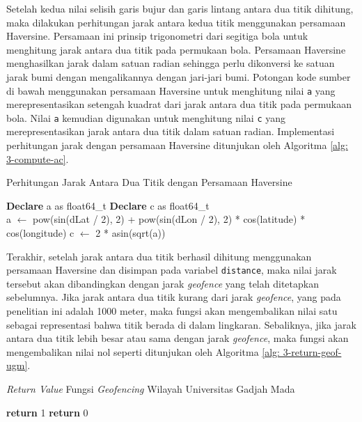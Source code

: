 Setelah kedua nilai selisih garis bujur dan garis lintang antara dua titik dihitung, maka dilakukan perhitungan jarak antara kedua titik menggunakan persamaan Haversine. Persamaan ini prinsip trigonometri dari segitiga bola untuk menghitung jarak antara dua titik pada permukaan bola. Persamaan Haversine menghasilkan jarak dalam satuan radian sehingga perlu dikonversi ke satuan jarak bumi dengan mengalikannya dengan jari-jari bumi. Potongan kode sumber di bawah menggunakan persamaan Haversine untuk menghitung nilai \texttt{a} yang merepresentasikan setengah kuadrat dari jarak antara dua titik pada permukaan bola. Nilai \texttt{a} kemudian digunakan untuk menghitung nilai \texttt{c} yang merepresentasikan jarak antara dua titik dalam satuan radian. Implementasi perhitungan jarak dengan persamaan Haversine ditunjukan oleh Algoritma \ref{alg: 3-compute-ac}.

\begin{algorithm}[H]
	\caption{Perhitungan Jarak Antara Dua Titik dengan Persamaan Haversine}
	\label{alg: 3-compute-ac}
	\begin{algorithmic}[1]
	\State \textbf{Declare} a as float64\_t
	\State \textbf{Declare} c as float64\_t
	\\
	\State a $\gets$ pow(sin(dLat / 2), 2) + pow(sin(dLon / 2), 2) * cos(latitude) * cos(longitude)
	\State c $\gets$ 2 * asin(sqrt(a))			
	\end{algorithmic}
\end{algorithm}

Terakhir, setelah jarak antara dua titik berhasil dihitung menggunakan persamaan Haversine dan disimpan pada variabel \texttt{distance}, maka nilai jarak tersebut akan dibandingkan dengan jarak \textit{geofence} yang telah ditetapkan sebelumnya. Jika jarak antara dua titik kurang dari jarak \textit{geofence}, yang pada penelitian ini adalah 1000 meter, maka fungsi akan mengembalikan nilai satu sebagai representasi bahwa titik berada di dalam lingkaran. Sebaliknya, jika jarak antara dua titik lebih besar atau sama dengan jarak \textit{geofence}, maka fungsi akan mengembalikan nilai nol seperti ditunjukan oleh Algoritma \ref{alg: 3-return-geof-ugm}.

\begin{algorithm}[H]
	\caption{\textit{Return Value} Fungsi \textit{Geofencing} Wilayah Universitas Gadjah Mada}
	\label{alg: 3-return-geof-ugm}
	\begin{algorithmic}[1]
		\State \textbf{return} 1
	\Else
		\State \textbf{return} 0
	\EndIf	
	\end{algorithmic}
\end{algorithm}

